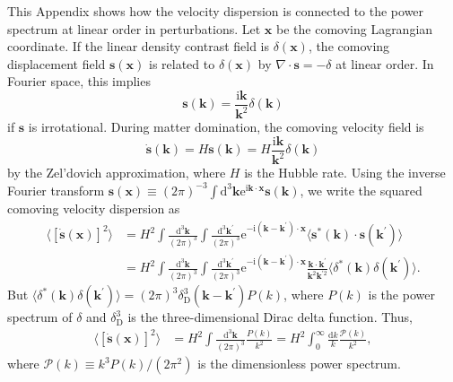 \documentclass[a4paper,11pt]{article}
\let\vec\bm%
\newcommand{\diff}{\ensuremath{\mathrm{d}}}
\newcommand{\e}{\mathrm{e}}
\newcommand{\I}{\mathrm{i}}
\newcommand{\p}{\prime}
\begin{document}
This Appendix shows how the velocity dispersion is connected to the power spectrum at linear order in perturbations. Let $\vec x$ be the comoving Lagrangian coordinate. If the linear density contrast field is $\delta(\vec x)$, the comoving displacement field $\vec s(\vec x)$ is related to $\delta(\vec x)$ by $\nabla\cdot\vec s=-\delta$ at linear order. In Fourier space, this implies
\begin{equation}
    \vec s(\vec k)=\frac{\I \vec k}{\vec k^2}\delta(\vec k)
\end{equation}
if $\vec s$ is irrotational. During matter domination, the comoving velocity field is
\begin{equation}
    \dot{\vec s}(\vec k)=H\vec s(\vec k)=H\frac{\I \vec k}{\vec k^2}\delta(\vec k)
\end{equation}
by the Zel'dovich approximation, where $H$ is the Hubble rate. Using the inverse Fourier transform
$\vec s(\vec x)\equiv (2\pi)^{-3}\int\diff^3\vec k\e^{\I\vec k\cdot\vec x}\vec s(\vec k)$,
we write the squared comoving velocity dispersion as
\begin{align}
    \langle [\dot{\vec s}(\vec x)]^2\rangle
    &=
    H^2\int\frac{\diff^3\vec k}{(2\pi)^3}
    \int\frac{\diff^3\vec k^\p}{(2\pi)^3}
    \e^{-\I(\vec k-\vec k^\prime)\cdot\vec x}
    \langle\vec s^*(\vec k)\cdot\vec s(\vec k^\p)\rangle
    \nonumber\\&= H^2
    \int\frac{\diff^3\vec k}{(2\pi)^3}
    \int\frac{\diff^3\vec k^\p}{(2\pi)^3}
    \e^{-\I(\vec k-\vec k^\prime)\cdot\vec x}
    \frac{\vec k\cdot\vec k^\p}{\vec k^2\vec k^{\p 2}}
    \langle\delta^*(\vec k)\delta(\vec k^\p)\rangle.
\end{align}
But $\langle\delta^*(\vec k)\delta(\vec k^\p)\rangle=(2\pi)^3\delta_\mathrm{D}^3(\vec k-\vec k^\p) P(k)$, where $P(k)$ is the power spectrum of $\delta$ and $\delta_\mathrm{D}^3$ is the three-dimensional Dirac delta function. Thus,
\begin{align}
    \langle [\dot{\vec s}(\vec x)]^2\rangle
    &= H^2
    \int\frac{\diff^3\vec k}{(2\pi)^3}
    \frac{P(k)}{k^2}
    = H^2
    \int_0^\infty\frac{\diff k}{k}
    \frac{\mathcal{P}(k)}{k^2},
\end{align}
where $\mathcal{P}(k)\equiv k^3 P(k)/(2\pi^2)$ is the dimensionless power spectrum.
\end{document}
